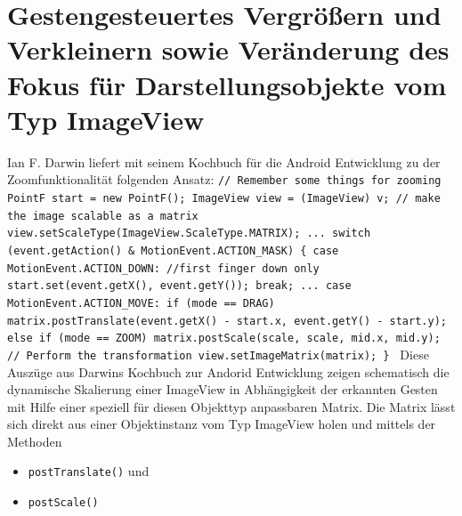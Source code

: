 \documentclass[12pt,oneside,a4paper,bibtotoc,liststotoc]{scrreprt}
\begin{document}
\section{Gestengesteuertes Vergrößern und Verkleinern sowie Veränderung des Fokus für Darstellungsobjekte vom Typ ImageView}
Ian F. Darwin liefert mit seinem Kochbuch für die Android Entwicklung zu der Zoomfunktionalität folgenden Ansatz: \newline
\texttt{// Remember some things for zooming \newline
PointF start = new PointF();\newline\newline
ImageView view = (ImageView) v;\newline
// make the image scalable as a matrix \newline
view.setScaleType(ImageView.ScaleType.MATRIX);\newline
...\newline
switch (event.getAction() \& MotionEvent.ACTION\_MASK) \{ \newline
case MotionEvent.ACTION\_DOWN: //first finger down only\newline
start.set(event.getX(), event.getY());\newline
break;\newline
...\newline
case MotionEvent.ACTION\_MOVE:\newline
if (mode == DRAG)\newline
matrix.postTranslate(event.getX() - start.x, event.getY() - start.y);\newline
\newline
else if (mode == ZOOM)\newline
matrix.postScale(scale, scale, mid.x, mid.y);\newline
\newline
// Perform the transformation\newline
view.setImageMatrix(matrix);\newline
\} \newline 
}\cite[S. 234-237.]{003}\newline
Diese Auszüge aus Darwins Kochbuch zur Andorid Entwicklung zeigen schematisch die dynamische Skalierung einer ImageView in Abhängigkeit der erkannten Gesten mit Hilfe einer speziell für diesen Objekttyp anpassbaren Matrix. Die Matrix lässt sich direkt aus einer Objektinstanz vom Typ ImageView holen und mittels der Methoden
\begin{itemize}
\item \texttt{postTranslate()} und
\item \texttt{postScale()}
\end{itemize}
\end{document}
